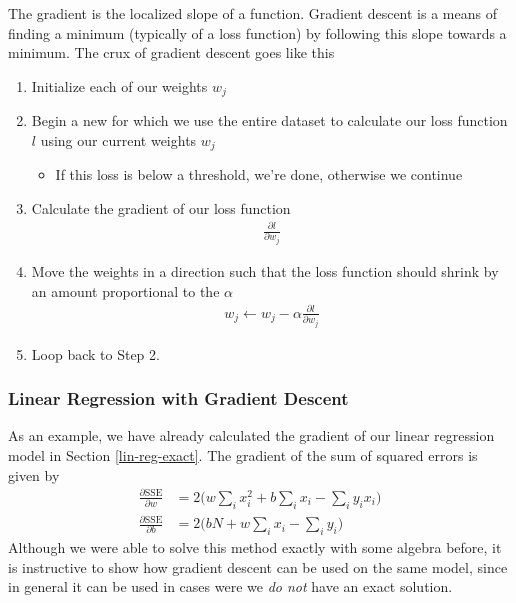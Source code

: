 The gradient is the localized slope of a function. Gradient descent is a means of finding a minimum (typically of a loss function) by following this slope towards a minimum. The crux of gradient descent goes like this
\begin{enumerate}
    \item Initialize each of our weights $w_j$
    \item Begin a new  for which we use the entire dataset to calculate our loss function $l$ using our current weights $w_j$
    \begin{itemize}
    \item If this loss is below a threshold, we're done, otherwise we continue    
    \end{itemize}
    \item Calculate the gradient of our loss function 
    \begin{align}
        \frac{\partial l}{\partial w_j}
    \end{align}
    \item Move the weights in a direction such that the loss function should shrink by an amount proportional to the  $\alpha$
    \begin{align}
        w_j \leftarrow w_j - \alpha\frac{\partial l}{\partial w_j}
    \end{align}
    \item Loop back to Step 2.
\end{enumerate}

\subsubsection{Linear Regression with Gradient Descent}

 As an example, we have already calculated the gradient of our linear regression model in Section \ref{lin-reg-exact}. The gradient of the sum of squared errors is given by
\begin{align}
    \frac{\partial \textrm{SSE}}{\partial w} &= 2\Big(w\sum_ix_i^2 + b\sum_i x_i -\sum_i y_i x_i\Big)\label{grad_sse_w}\\
    \frac{\partial \textrm{SSE}}{\partial b} &= 2\Big(bN + w \sum_i x_i - \sum_i y_i \Big)\label{grad_sse_b}
\end{align}
Although we were able to solve this method exactly with some algebra before, it is instructive to show how gradient descent can be used on the same model, since in general it can be used in cases were we \emph{do not} have an exact solution.

